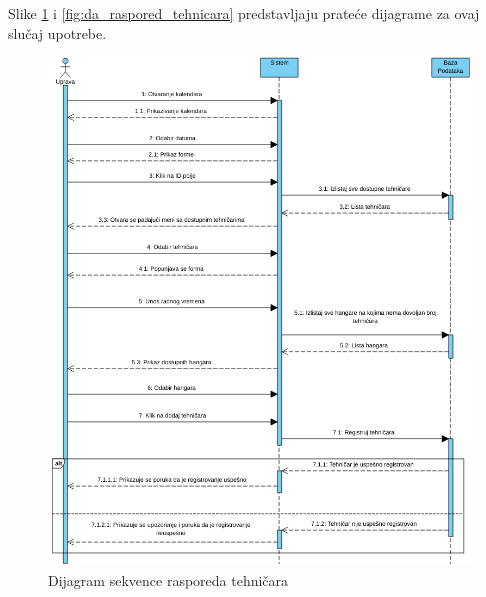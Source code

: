 \documentclass[a4paper]{article}
\begin{document}
Slike \ref{fig:ds_raspored_tehnicara} i \ref{fig:da_raspored_tehnicara} predstavljaju prateće dijagrame za ovaj slučaj upotrebe.
\begin{figure}[H]
\begin{center}
\includegraphics[scale=0.5, width = 1.1\textwidth]{Dijagrami/Dijagrami_sekvence/Dijagram_sekvence_rasporeda_tehničara.png}
\end{center}
\caption{Dijagram sekvence rasporeda tehničara}
\label{fig:ds_raspored_tehnicara}
\end{figure}
\end{document}
